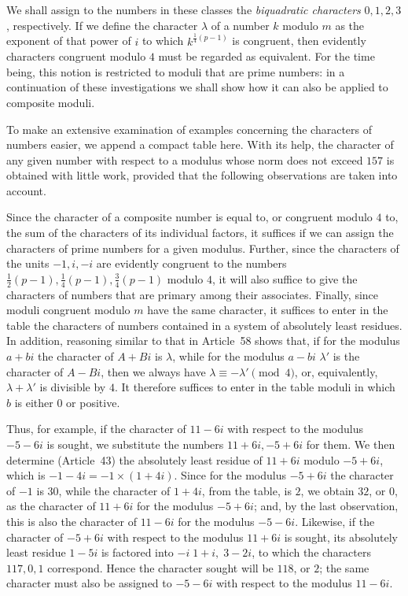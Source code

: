 We shall assign to the numbers in these classes the \emph{biquadratic characters} $0,1,2,3$, respectively. If we define the character $\lambda$ of a number $k$ modulo $m$ as the exponent of that power of $i$ to which $k^{\frac14(p-1)}$ is congruent, then evidently characters congruent modulo $4$ must be regarded as equivalent. For the time being, this notion is restricted to moduli that are prime numbers: in a continuation of these investigations we shall show how it can also be applied to composite moduli.

To make an extensive examination of examples concerning the characters of numbers easier, we append a compact table here. With its help, the character of any given number with respect to a modulus whose norm does not exceed $157$ is obtained with little work, provided that the following observations are taken into account.

%
Since the character of a composite number is equal to, or congruent modulo $4$ to, the sum of the characters of its individual factors, it suffices if we can assign the characters of prime numbers for a given modulus. Further, since the characters of the units $-1,i,-i$ are evidently congruent to the numbers $\frac12(p-1),\frac14(p-1),\frac34(p-1)$ modulo $4$, it will also suffice to give the characters of numbers that are primary among their associates. Finally, since moduli congruent modulo $m$ have the same character, it suffices to enter in the table the characters of numbers contained in a system of absolutely least residues. In addition, reasoning similar to that in Article~58 shows that, if for the modulus $a+bi$ the character of $A+Bi$ is $\lambda$, while for the modulus $a-bi$ $\lambda'$ is the character of $A-Bi$, then we always have $\lambda\equiv-\lambda'\pmod4$, or, equivalently, $\lambda+\lambda'$ is divisible by $4$. It therefore suffices to enter in the table moduli in which $b$ is either $0$ or positive.

Thus, for example, if the character of $11-6i$ with respect to the modulus $-5-6i$ is sought, we substitute the numbers $11+6i,-5+6i$ for them. We then determine (Article~43) the absolutely least residue of $11+6i$ modulo $-5+6i$, which is $-1-4i=-1\times(1+4i)$. Since for the modulus $-5+6i$ the character of $-1$ is $30$, while the character of $1+4i$, from the table, is $2$, we obtain $32$, or $0$, as the character of $11+6i$ for the modulus $-5+6i$; and, by the last observation, this is also the character of $11-6i$ for the modulus $-5-6i$. Likewise, if the character of $-5+6i$ with respect to the modulus $11+6i$ is sought, its absolutely least residue $1-5i$ is factored into $-i\;1+i,\;3-2i$, to which the characters $117,0,1$ correspond. Hence the character sought will be $118$, or $2$; the same character must also be assigned to $-5-6i$ with respect to the modulus $11-6i$.

